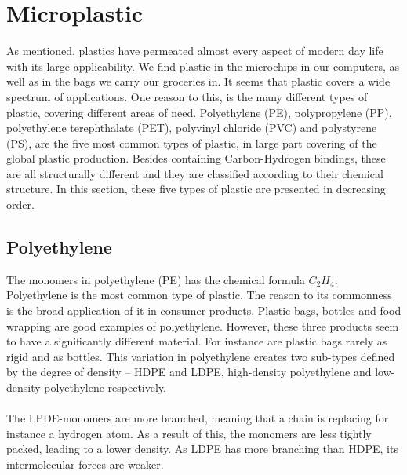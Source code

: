 \section{Microplastic} \label{sec:microplastic}
\noindent
As mentioned, plastics have permeated almost every aspect of modern day life with its large applicability. We find plastic in the microchips in our computers, as well as in the bags we carry our groceries in. It seems that plastic covers a wide spectrum of applications.  One reason to this, is the many different types of plastic, covering different areas of need. Polyethylene (PE), polypropylene (PP), polyethylene terephthalate (PET), polyvinyl chloride (PVC) and polystyrene (PS), are the five most common types of plastic, in large part covering of the global plastic production. Besides containing Carbon-Hydrogen bindings, these are all structurally different and they are classified according to their chemical structure. In this section, these five types of plastic are presented in decreasing order. 


\subsection{Polyethylene}
The monomers in polyethylene (PE) has the chemical formula $C_2H_4$. Polyethylene is the most common type of plastic. The reason to its commonness is the broad application of it in consumer products. Plastic bags, bottles and food wrapping are good examples of polyethylene. However, these three products seem to have a significantly different material. For instance are plastic bags rarely as rigid and as bottles. This variation in polyethylene creates two sub-types defined by the degree of density – HDPE and LDPE, high-density polyethylene and low-density polyethylene respectively. 
\\\\
The LPDE-monomers are more branched, meaning that a chain is replacing for instance a hydrogen atom. As a result of this, the monomers are less tightly packed, leading to a lower density.  As LDPE has more branching than HDPE, its intermolecular forces are weaker.


